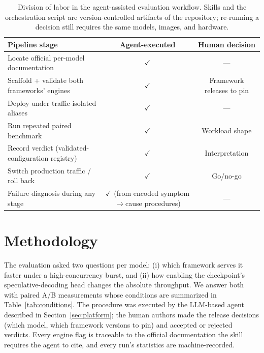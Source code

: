 \documentclass[11pt]{article}
\begin{document}
\begin{table}[t]
\centering
\small
\begin{tabularx}{\textwidth}{Xcc}
\toprule
\textbf{Pipeline stage} & \textbf{Agent-executed} & \textbf{Human decision} \\
\midrule
Locate official per-model documentation & $\checkmark$ & --- \\
Scaffold + validate both frameworks' engines & $\checkmark$ & Framework releases to pin \\
Deploy under traffic-isolated aliases & $\checkmark$ & --- \\
Run repeated paired benchmark & $\checkmark$ & Workload shape \\
Record verdict (validated-configuration registry) & $\checkmark$ & Interpretation \\
Switch production traffic / roll back & $\checkmark$ & Go/no-go \\
Failure diagnosis during any stage & $\checkmark$ (from encoded symptom$\rightarrow$cause procedures) & --- \\
\bottomrule
\end{tabularx}
\caption{Division of labor in the agent-assisted evaluation workflow. Skills and the orchestration script are version-controlled artifacts of the repository; re-running a decision still requires the same models, images, and hardware.}
\label{tab:labor}
\end{table}

\section{Methodology}
\label{sec:method}

The evaluation asked two questions per model: (i) which framework serves it faster under a high-concurrency burst, and (ii) how enabling the checkpoint's speculative-decoding head changes the absolute throughput. We answer both with paired A/B measurements whose conditions are summarized in Table~\ref{tab:conditions}. The procedure was executed by the LLM-based agent described in Section~\ref{sec:platform}; the human authors made the release decisions (which model, which framework versions to pin) and accepted or rejected verdicts. Every engine flag is traceable to the official documentation the skill requires the agent to cite, and every run's statistics are machine-recorded.
\end{document}
